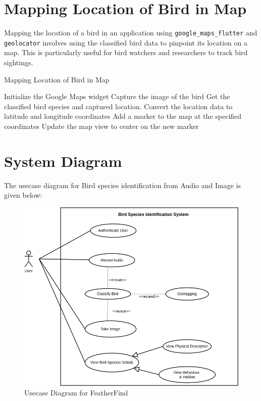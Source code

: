 \newpage


\section{Mapping Location of Bird in Map}

Mapping the location of a bird in an application using
\texttt{google\_maps\_flutter} and \texttt{geolocator} involves using the
classified bird data to
pinpoint its location on a map. This is particularly useful for bird watchers
and researchers to track bird sightings.

\begin{algorithm}
    \caption{Mapping Location of Bird in Map}
    \begin{algorithmic}[1]
        \STATE Initialize the Google Maps widget
        \STATE Capture the image of the bird
        \STATE Get the classified bird species and captured location.
        \STATE Convert the location data to latitude and longitude coordinates
        \STATE Add a marker to the map at the specified coordinates
        \STATE Update the map view to center on the new marker
    \end{algorithmic}
\end{algorithm}
\newpage
\section{System Diagram}
The usecase diagram for Bird species identification from Audio and Image is
given
below:
\begin{figure}[h!]
    \centering
    \includegraphics[scale=0.5]{images/usecase.png}
    \caption{Usecase Diagram for
        FeatherFind}%
\end{figure}

